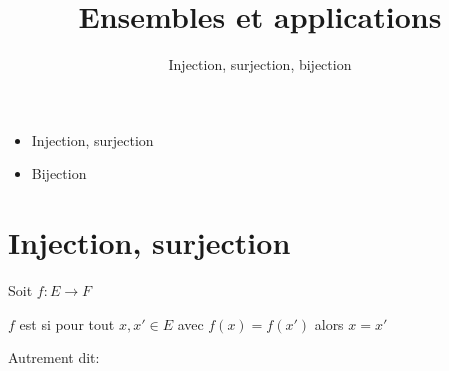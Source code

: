 






\title{{\bf Ensembles et applications}}
\subtitle{Injection, surjection, bijection}


\begin{frame}
  
  \debutmontitre

  \pause

{\footnotesize
\hfill
{}
\begin{minipage}{0.6\textwidth}
  \begin{itemize}
    \item<3-> Injection, surjection
    \item<4-> Bijection
  \end{itemize}
\end{minipage}
}

\end{frame}

\setcounter{framenumber}{0}


\section{Injection, surjection}


\begin{frame}

Soit $f : E \to F$
\begin{mydefinition}
$f$ est  si pour tout $x,x' \in E$ avec $f(x)=f(x')$ alors $x=x'$
\end{mydefinition}

\pause

Autrement dit:

\bigskip
\pause


\end{frame} 



